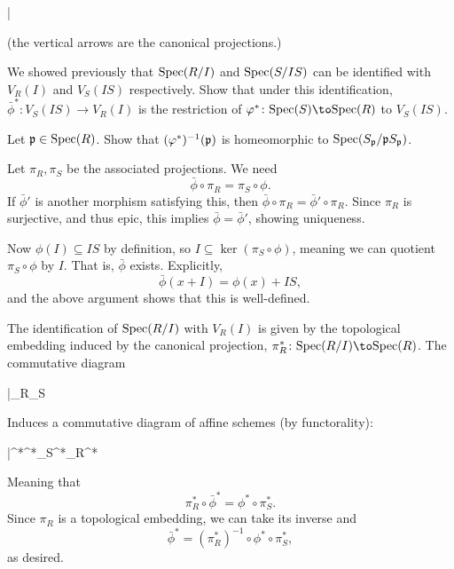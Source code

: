                 {\phi}{\bar\phi}{}{}

            (the vertical arrows are the canonical projections.)

            \item We showed previously that ${\rm Spec}(R/I)$ and ${\rm Spec}(S/IS)$ can be identified with $V_R(I)$ and
            $V_S(IS)$ respectively.
            Show that under this identification, $\bar\phi^*\colon V_S(IS)\to V_R(I)$ is the restriction of
            $\phi^*\colon\spec(S)\to\spec(R)$ to $V_S(IS)$.
        \eenum

        \item Let ${{\frak p}}\in{\rm Spec}(R)$.
        Show that $(\varphi^*)^{-1}({{\frak p}})$ is homeomorphic to ${\rm Spec}(S_{{\frak p}}/{{\frak p}} S_{{\frak p}})$.
    \eenum

\eprob

\benum
    \item
    \benum
        \item Let $\pi_R,\pi_S$ be the associated projections.
        We need
        $$ \bar\phi\circ\pi_R = \pi_S\circ\phi . $$
        If $\bar\phi'$ is another morphism satisfying this, then $\bar\phi\circ\pi_R=\bar\phi'\circ\pi_R$.
        Since $\pi_R$ is surjective, and thus epic, this implies $\bar\phi=\bar\phi'$, showing uniqueness.

        Now $\phi(I)\subseteq IS$ by definition, so $I\subseteq\ker(\pi_S\circ\phi)$, meaning we can quotient
        $\pi_S\circ\phi$ by $I$.
        That is, $\bar\phi$ exists.
        Explicitly,
        $$ \bar\phi(x+I) = \phi(x) + IS , $$
        and the above argument shows that this is well-defined.

        \item The identification of ${\rm Spec}(R/I)$ with $V_R(I)$ is given by the topological embedding induced by the canonical
        projection, $\pi_R^*\colon\spec(R/I)\to\spec(R)$.
        The commutative diagram

            {\phi}{\bar\phi}{\pi_R}{\pi_S}

        Induces a commutative diagram of affine schemes (by functorality):

            {\bar\phi^*}{\phi^*}{\pi_S^*}{\pi_R^*}

        Meaning that
        $$ \pi_R^*\circ\bar\phi^* = \phi^*\circ\pi_S^* . $$
        Since $\pi_R$ is a topological embedding, we can take its inverse and
        $$ \bar\phi^* = (\pi_R^*)^{-1}\circ\phi^*\circ\pi_S^* , $$
        as desired.
    \eenum

